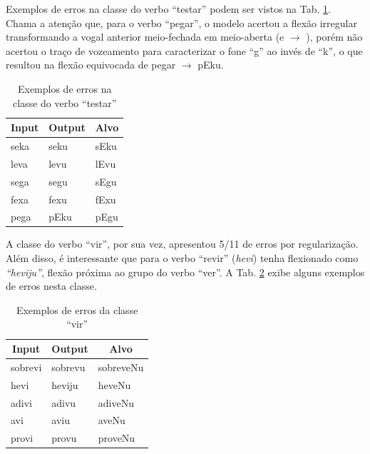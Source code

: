 Exemplos de erros na classe do verbo “testar” podem ser vistos na Tab. \ref{tab:class_testar}. Chama a atenção que, para o verbo “pegar”, o modelo acertou a flexão irregular transformando a vogal anterior meio-fechada em meio-aberta (e $\rightarrow$ \textepsilon), porém não acertou o traço de vozeamento para caracterizar o fone “g” ao invés de “k”, o que resultou na flexão equivocada de pegar $\rightarrow$ pEku.

\begin{table}[H]
\begin{tabular}{lll}
\multicolumn{1}{c}{Input} & \multicolumn{1}{c}{Output} & \multicolumn{1}{c}{Alvo} \\ \hline
seka                      & seku                       & sEku                     \\
leva                      & levu                       & lEvu                     \\
sega                      & segu                       & sEgu                     \\
fexa                      & fexu                       & fExu                     \\
pega                      & pEku                       & pEgu                     \\ \hline
\end{tabular}
\caption{Exemplos de erros na classe do verbo “testar”}
\label{tab:class_testar}
\end{table}

A classe do verbo “vir”, por sua vez, apresentou 5/11 de erros por regularização. Além disso, é interessante que para o verbo “revir” (\textit{hevi}) tenha flexionado como \textit{“heviju”}, flexão próxima ao grupo do verbo “ver”. A Tab. \ref{tab:class_vir} exibe alguns exemplos de erros nesta classe.

\begin{table}[H]
\begin{tabular}{lll}
\multicolumn{1}{c}{Input} & \multicolumn{1}{c}{Output} & \multicolumn{1}{c}{Alvo} \\ \hline
sobrevi                   & sobrevu                    & sobreveNu                \\
hevi                      & heviju                     & heveNu                   \\
adivi                     & adivu                      & adiveNu                  \\
avi                       & aviu                       & aveNu                    \\
provi                     & provu                      & proveNu                  \\ \hline
\end{tabular}
\caption{Exemplos de erros da classe “vir”}
\label{tab:class_vir}
\end{table}


